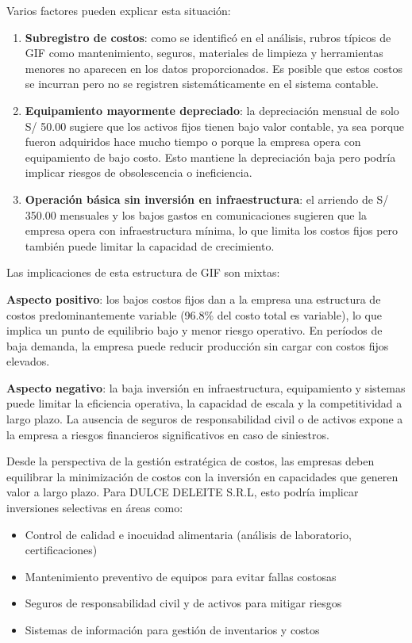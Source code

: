 \documentclass[
  stu,
  floatsintext,
  longtable,
  a4paper,
  nolmodern,
  notxfonts,
  notimes,
  12pt,
  colorlinks=true,linkcolor=blue,citecolor=blue,urlcolor=blue]{apa7}
\providecommand{\tightlist}{%
  \setlength{\itemsep}{0pt}\setlength{\parskip}{0pt}}
\begin{document}
Varios factores pueden explicar esta situación:

\begin{enumerate}
\def\labelenumi{\arabic{enumi}.}
\item
  \textbf{Subregistro de costos}: como se identificó en el análisis,
  rubros típicos de GIF como mantenimiento, seguros, materiales de
  limpieza y herramientas menores no aparecen en los datos
  proporcionados. Es posible que estos costos se incurran pero no se
  registren sistemáticamente en el sistema contable.
\item
  \textbf{Equipamiento mayormente depreciado}: la depreciación mensual
  de solo S/ 50.00 sugiere que los activos fijos tienen bajo valor
  contable, ya sea porque fueron adquiridos hace mucho tiempo o porque
  la empresa opera con equipamiento de bajo costo. Esto mantiene la
  depreciación baja pero podría implicar riesgos de obsolescencia o
  ineficiencia.
\item
  \textbf{Operación básica sin inversión en infraestructura}: el
  arriendo de S/ 350.00 mensuales y los bajos gastos en comunicaciones
  sugieren que la empresa opera con infraestructura mínima, lo que
  limita los costos fijos pero también puede limitar la capacidad de
  crecimiento.
\end{enumerate}

Las implicaciones de esta estructura de GIF son mixtas:

\textbf{Aspecto positivo}: los bajos costos fijos dan a la empresa una
estructura de costos predominantemente variable (96.8\% del costo total
es variable), lo que implica un punto de equilibrio bajo y menor riesgo
operativo. En períodos de baja demanda, la empresa puede reducir
producción sin cargar con costos fijos elevados.

\textbf{Aspecto negativo}: la baja inversión en infraestructura,
equipamiento y sistemas puede limitar la eficiencia operativa, la
capacidad de escala y la competitividad a largo plazo. La ausencia de
seguros de responsabilidad civil o de activos expone a la empresa a
riesgos financieros significativos en caso de siniestros.

Desde la perspectiva de la gestión estratégica de costos, las empresas
deben equilibrar la minimización de costos con la inversión en
capacidades que generen valor a largo plazo. Para DULCE DELEITE S.R.L,
esto podría implicar inversiones selectivas en áreas como:

\begin{itemize}
\tightlist
\item
  Control de calidad e inocuidad alimentaria (análisis de laboratorio,
  certificaciones)
\item
  Mantenimiento preventivo de equipos para evitar fallas costosas
\item
  Seguros de responsabilidad civil y de activos para mitigar riesgos
\item
  Sistemas de información para gestión de inventarios y costos
\end{itemize}
\end{document}
